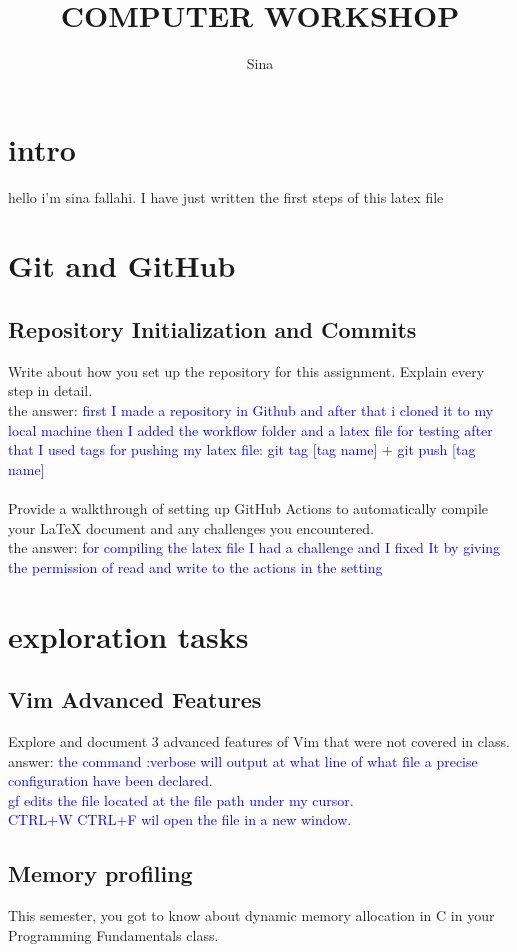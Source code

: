 \documentclass[titlepage]{article}
\title{COMPUTER WORKSHOP}
\author{Sina}
\begin{document}
\maketitle
\section{intro}
hello i'm sina fallahi. I have just written the first steps of this latex file

\section{Git and GitHub}

\subsection{Repository Initialization and Commits}
Write about how you set up the repository for this assignment. Explain every step in
detail.\\
the answer: \textcolor{blue}{first I made a repository in Github and after that i cloned it to my local machine then I added the workflow folder and a latex file for testing after that I used tags for pushing my latex file: git tag [tag name] + git push [tag name]}
\\ \\Provide a walkthrough of setting up GitHub Actions to automatically compile your LaTeX
document and any challenges you encountered.\\
the answer: \textcolor{blue}{for compiling the latex file I had a challenge and I fixed It by giving the permission of read and write to the actions in the setting}
\section{exploration tasks}
\subsection{Vim Advanced Features}
Explore and document 3 advanced features of Vim that were not covered in class.\\answer: \textcolor{blue}{the command :verbose will output at what line of what file a precise configuration have been declared.\\ gf edits the file located at the file path under my cursor.\\ CTRL+W CTRL+F wil open the file in a new window.}
\subsection{Memory profiling}
This semester, you got to know about dynamic memory allocation in C in your Programming Fundamentals class.
\end{document}
